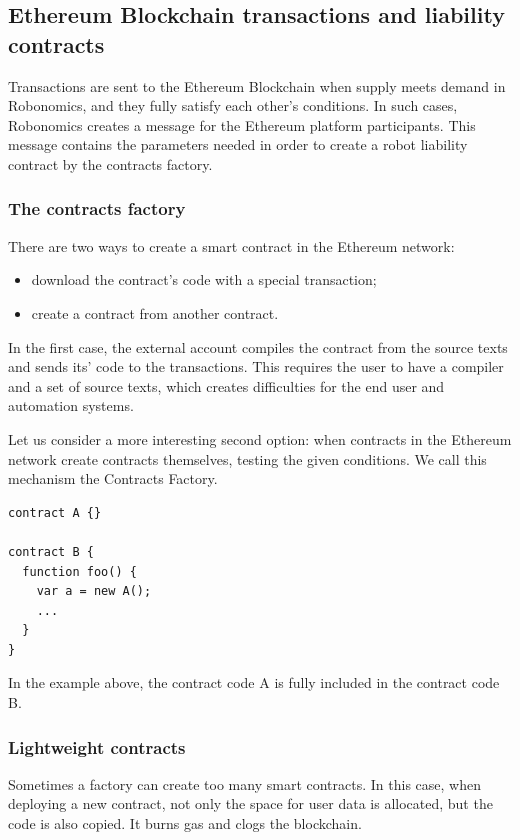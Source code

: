 \documentclass{article}
\begin{document}
\subsection{Ethereum Blockchain transactions and liability contracts}

Transactions are sent to the Ethereum Blockchain when supply meets demand in Robonomics, and they fully satisfy each other's conditions. In such cases, Robonomics creates a message for the Ethereum platform participants. This message contains the parameters needed in order to create a robot liability contract by the contracts factory.

\subsubsection{The contracts factory}

There are two ways to create a smart contract in the Ethereum network:
\begin{itemize}[noitemsep]
	\item download the contract's code with a special transaction;
	\item create a contract from another contract.
\end{itemize}

In the first case, the external account compiles the contract from the source texts and sends its' code to the transactions. This requires the user to have a compiler and a set of source texts, which creates difficulties for the end user and automation systems.

Let us consider a more interesting second option: when contracts in the Ethereum network create contracts themselves, testing the given conditions. We call this mechanism the Contracts Factory.

\begin{lstlisting}
contract A {}

contract B {
  function foo() {
    var a = new A();
    ...
  }
}
\end{lstlisting}

In the example above, the contract code A is fully included in the contract code B.

\subsubsection{Lightweight contracts}

Sometimes a factory can create too many smart contracts. In this case, when deploying a new contract, not only the space for user data is allocated, but the code is also copied. It burns gas and clogs the blockchain.
\end{document}
